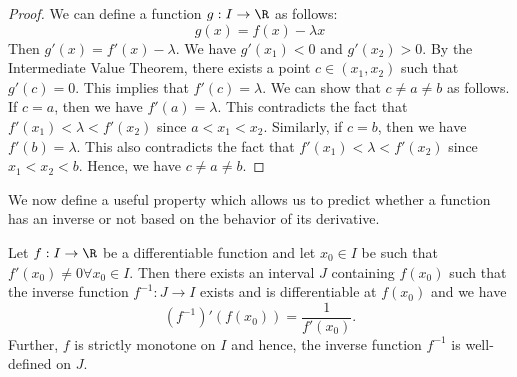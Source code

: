 \documentclass[openany]{book}
\begin{document}
\begin{proof}
    We can define a function $g: I \to \R$ as follows:
    \[
        g(x) = f(x) - \lambda x
    \]
    Then $g'(x) = f'(x) - \lambda$. We have $g'(x_1) < 0$ and $g'(x_2) > 0$. By the Intermediate Value Theorem, there exists a point $c \in (x_1, x_2)$ such that $g'(c) = 0$. This implies that $f'(c) = \lambda$.
    We can show that $c \neq a \neq b$ as follows. If $c = a$, then we have $f'(a) = \lambda$. This contradicts the fact that $f'(x_1) < \lambda < f'(x_2)$ since $a < x_1 < x_2$. Similarly, if $c = b$, then we have $f'(b) = \lambda$. This also contradicts the fact that $f'(x_1) < \lambda < f'(x_2)$ since $x_1 < x_2 < b$. Hence, we have $c \neq a \neq b$.
\end{proof}
We now define a useful property which allows us to predict whether a function has an inverse or not based on the behavior of its derivative.
\begin{mytheorem}
    Let $f: I \to \R$ be a differentiable function and let $x_0 \in I$ be such that $f'(x_0) \neq 0 \forall x_0 \in I$. Then there exists an interval $J$ containing $f(x_0)$ such that the inverse function $f^{-1}: J \to I$ exists and is differentiable at $f(x_0)$ and we have
    \[
        (f^{-1})'(f(x_0)) = \frac{1}{f'(x_0)}.
    \]
    Further, $f$ is strictly monotone on $I$ and hence, the inverse function $f^{-1}$ is well-defined on $J$.
\end{mytheorem}
\end{document}
